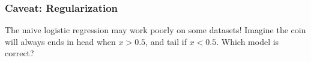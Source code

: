 \documentclass[10pt,aspectratio=169]{beamer}
\begin{document}
      \begin{frame}
        \frametitle{Caveat: Regularization}
        
        The naive logistic regression may work poorly on some
        datasets! Imagine the coin will always ends in head when
        $x > 0.5$, and tail if $x < 0.5$. Which model is correct?

        \begin{figure}[t]
          
        \end{figure}
        
      \end{frame}
\end{document}
